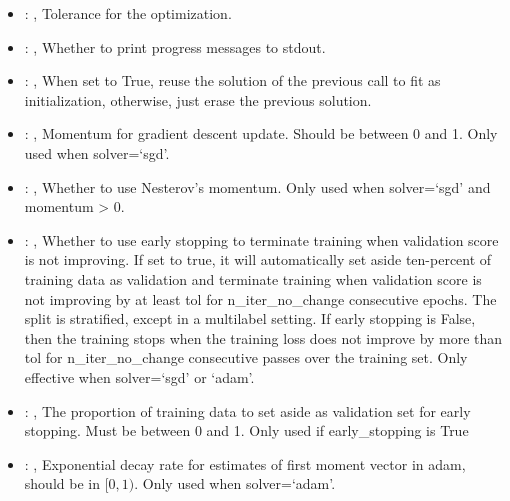 \begin{itemize}
    \item {}: , 
      Tolerance for the optimization.

    \item {}: , 
      Whether to print progress messages to stdout.

    \item {}: , 
      When set to True, reuse the solution of the previous call to fit as initialization, otherwise,
      just erase the previous solution.

    \item {}: , 
      Momentum for gradient descent update. Should be between 0 and 1. Only used when solver=`sgd'.

    \item {}: , 
      Whether to use Nesterov's momentum. Only used when solver=`sgd' and momentum > 0.

    \item {}: , 
      Whether to use early stopping to terminate training when validation score is not improving.
      If set to true, it will automatically set aside ten-percent of training data as validation and
      terminate                                                  training when validation score is
      not improving by at least tol for n\_iter\_no\_change consecutive
      epochs. The split is stratified, except in a multilabel setting. If early stopping is False,
      then                                                  the training stops when the training
      loss does not improve by more than tol for n\_iter\_no\_change
      consecutive passes over the training set. Only effective when solver=`sgd' or `adam'.

    \item {}: , 
      The proportion of training data to set aside as validation set for early stopping. Must be
      between 0 and 1.                                                  Only used if early\_stopping
      is True

    \item {}: , 
      Exponential decay rate for estimates of first moment vector in adam, should be in $[0, 1)$.
      Only used when solver=`adam'.


\end{itemize}
